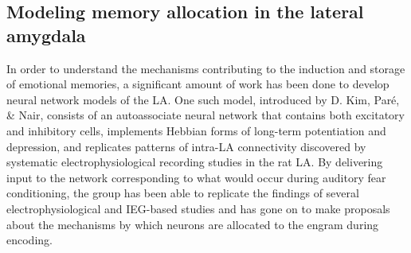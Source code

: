 \documentclass[12pt,a4paper,]{report}
\begin{document}
\subsection{Modeling memory allocation in the lateral
amygdala}\label{modeling-memory-allocation-in-the-lateral-amygdala}

In order to understand the mechanisms contributing to the induction and
storage of emotional memories, a significant amount of work has been
done to develop neural network models of the LA. One such model,
introduced by D. Kim, Paré, \& Nair, consists of an autoassociate neural
network that contains both excitatory and inhibitory cells, implements
Hebbian forms of long-term potentiation and depression, and replicates
patterns of intra-LA connectivity discovered by systematic
electrophysiological recording studies in the rat LA. By delivering
input to the network corresponding to what would occur during auditory
fear conditioning, the group has been able to replicate the findings of
several electrophysiological and IEG-based studies and has gone on to
make proposals about the mechanisms by which neurons are allocated to
the engram during encoding.
\end{document}
